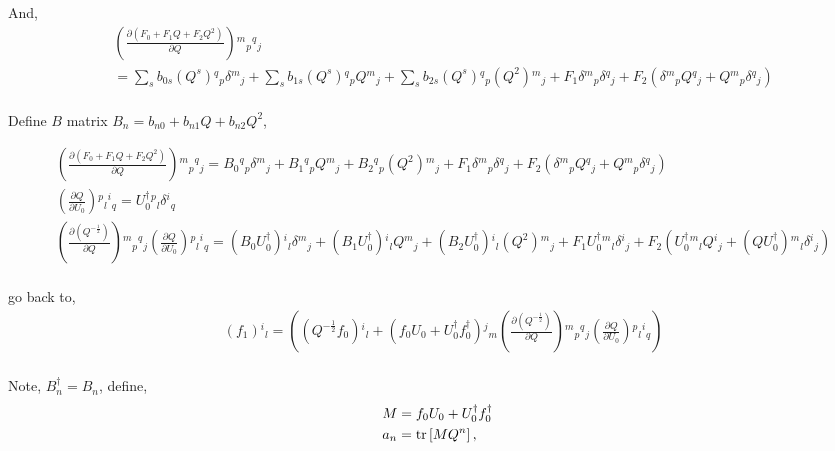 And,
\begin{equation}
\begin{split}
&\left(\frac{\partial \left(F_0+F_1Q+F_2Q^2\right)}{\partial Q}\right) {}^m{}_p{}^q{}_j\\
&=\sum _s b_{0s} (Q^s) {}^q{}_p\delta {}^m{}_j + \sum _s b_{1s} (Q^s) {}^q{}_p Q{}^m{}_j + \sum _s b_{2s} (Q^s) {}^q{}_p (Q^2){}^m{}_j + F_1 \delta {}^m{}_p \delta {}^q{}_j + F_2 \left(\delta {}^m{}_pQ{}^q{}_j+Q {}^m{}_p\delta {}^q{}_j\right)\\
\end{split}
\end{equation}

Define $B$ matrix $B_n = b_{n0}+b_{n1}Q+b_{n2}Q^2$,

\begin{equation}
\begin{split}
&\left(\frac{\partial \left(F_0+F_1Q+F_2Q^2\right)}{\partial Q}\right) {}^m{}_p{}^q{}_j=B_0{}^q{}_p\delta {}^m{}_j + B_1 {}^q{}_p Q{}^m{}_j + B_2 {}^q{}_p (Q^2){}^m{}_j + F_1 \delta {}^m{}_p \delta {}^q{}_j + F_2 \left(\delta {}^m{}_pQ{}^q{}_j+Q {}^m{}_p\delta {}^q{}_j\right)\\
&\left(\frac{\partial Q}{\partial U_0}\right){}^p{}_l{}^i{}_q=U_0^{\dagger}{}^p{}_l \delta {}^i{}_q\\
&\left(\frac{\partial \left(Q^{-\frac{1}{2}}\right)}{\partial Q }\right){}^m{}_p{}^q{}_j \left(\frac{\partial Q}{\partial U_0 }\right){}^p{}_l{}^i{}_q=\left(B_0U_0^{\dagger}\right){}^i{}_l\delta {}^m{}_j + \left(B_1 U_0^{\dagger}\right){}^i{}_l Q{}^m{}_j + \left(B_2 U_0^{\dagger}\right){}^i{}_l (Q^2){}^m{}_j + F_1 U_0^{\dagger} {}^m{}_l \delta {}^i{}_j + F_2 \left(U_0^{\dagger} {}^m{}_lQ{}^i{}_j+\left(Q U_0^{\dagger}\right){}^m{}_l\delta {}^i{}_j\right)\\
\end{split}
\end{equation}

go back to,
\begin{equation}
\begin{split}
&(f_1){}^i{}_l=\left(\left(Q^{-\frac{1}{2}}f_0\right){}^i{}_l+\left(f_0U_0+U_0^{\dagger}f_0^{\dagger}\right) {}^j{}_m \left(\frac{\partial \left(Q^{-\frac{1}{2}}\right)}{\partial Q }\right){}^m{}_p{}^q{}_j \left(\frac{\partial Q}{\partial U_0 }\right){}^p{}_l{}^i{}_q\right)\\
\end{split}
\end{equation}

Note, $B_n^{\dagger}=B_n$, define,
\begin{equation}
\begin{split}
&M=f_0U_0+U_0^{\dagger}f_0^{\dagger}\\
&a_n={\rm tr}\left[MQ^n\right],\\
\end{split}
\end{equation}

